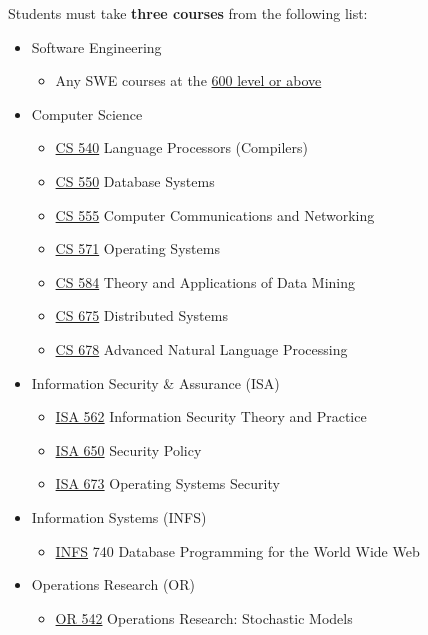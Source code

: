 \documentclass[oneside,11pt]{memoir}
\begin{document}
Students must take \textbf{three courses} from the following list:

\begin{itemize} 
\item Software Engineering
\begin{itemize}
    \item Any SWE courses at the \href{https://catalog.gmu.edu/courses/swe/}{600 level or above}
\end{itemize}
\item Computer Science

\begin{itemize}
    \item \href{https://catalog.gmu.edu/search/?P=CS%20540}{CS 540} Language Processors (Compilers)
    \item \href{https://catalog.gmu.edu/search/?P=CS%20550}{CS 550} Database Systems
    \item \href{https://catalog.gmu.edu/search/?P=CS%20555}{CS 555} Computer Communications and Networking
    \item \href{https://catalog.gmu.edu/search/?P=CS%20571}{CS 571} Operating Systems
    \item \href{https://catalog.gmu.edu/search/?P=CS%20584}{CS 584} Theory and Applications of Data Mining
    \item \href{https://catalog.gmu.edu/search/?P=CS%20675}{CS 675} Distributed Systems
    \item \href{https://catalog.gmu.edu/search/?P=CS%20678}{CS 678} Advanced Natural Language Processing
\end{itemize}

\item Information Security \& Assurance (ISA)

\begin{itemize}
    \item \href{https://catalog.gmu.edu/search/?P=ISA%20562}{ISA 562} Information Security Theory and Practice
    \item \href{https://catalog.gmu.edu/search/?P=ISA%20650}{ISA 650} Security Policy
    \item \href{https://catalog.gmu.edu/search/?P=ISA%20673}{ISA 673} Operating Systems Security
\end{itemize}

\item Information Systems (INFS)
\begin{itemize}
    \item \href{https://catalog.gmu.edu/search/?P=INFS%20740}{INFS} 740 Database Programming for the World Wide Web
\end{itemize}

\item Operations Research (OR)
\begin{itemize}
    \item \href{https://catalog.gmu.edu/search/?P=OR%20542}{OR 542} Operations Research: Stochastic Models
\end{itemize}

\end{itemize}
\end{document}
